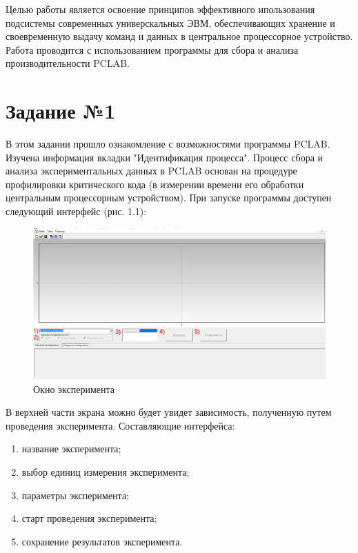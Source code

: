 \setcounter{page}{2}


Целью работы является освоение принципов эффективного ипользования подсистемы современных универскальных ЭВМ, обеспечивающих хранение и своевременную выдачу команд и данных в центральное процессорное устройство. Работа проводится с использованием программы для сбора и анализа производительности PCLAB.

\chapter{Задание №1}

В этом задании прошло ознакомление с возможностями программы PCLAB. Изучена информация вкладки "Идентификация процесса". Процесс сбора и анализа экспериментальных данных в PCLAB основан на процедуре профилировки критического кода (в измерении времени его обработки центральным процессорным устройством). При запуске программы доступен следующий интерфейс (рис. 1.1):

\begin{figure}[H]
	\begin{center}
		\includegraphics[scale=0.5]{assets/task1.png}
	\end{center}
	\caption{Окно эксперимента}
\end{figure}

В верхней части экрана можно будет увидет зависимость, полученную путем проведения эксперимента. Составляющие интерфейса:
\begin{enumerate}
	\item название эксперимента;
	\item выбор единиц измерения эксперимента;
	\item параметры эксперимента;
	\item старт проведения эксперимента;
	\item сохранение результатов эксперимента.
\end{enumerate}

